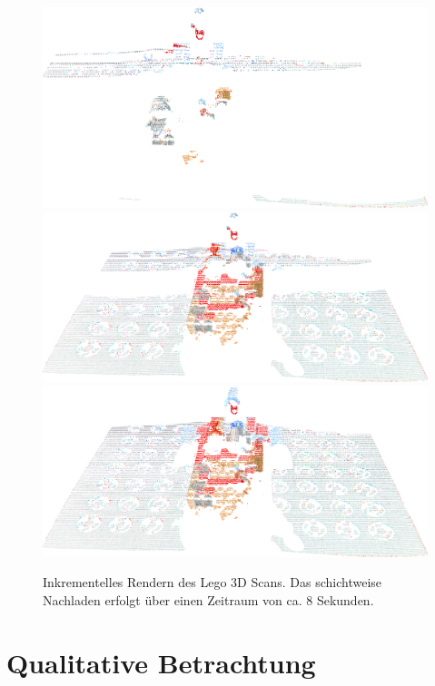\documentclass[hyperref, beleg, german]{cgvpub}
\begin{document}
\begin{figure}
	\centering
	\includegraphics[width = \linewidth]{images/Lego/126}
	\includegraphics[width = \linewidth]{images/Lego/150}
	\includegraphics[width = \linewidth]{images/Lego/170}
	\caption{Inkrementelles Rendern des Lego 3D Scans.
	Das schichtweise Nachladen erfolgt über einen Zeitraum von ca. 8 Sekunden.}%
	\label{img:lego}
\end{figure}

\section{Qualitative Betrachtung}
\end{document}
